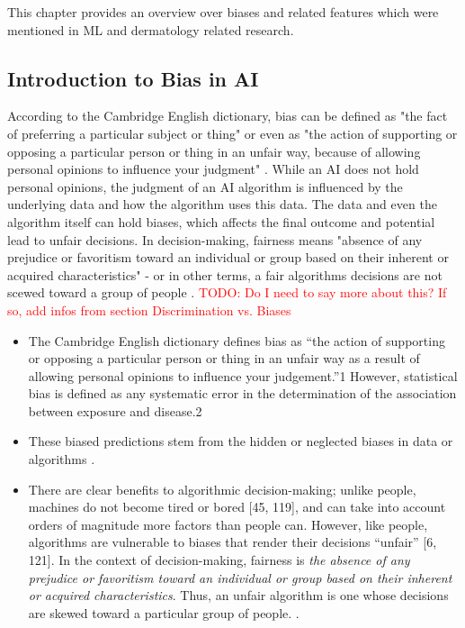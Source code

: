 \documentclass[12pt, a4paper, oneside]{book}   	%
\renewcommand{\todo}[1]{\textcolor{red}{TODO: #1}}
\newif\ifrawcitationactive
\newcommand{\rawcitationusedstart}{\color{violet}}
\newcommand{\rawcitationusedend}{%
	\ifrawcitationactive
	\color{purple}  %
	\else
	\color{black}  %
	\fi
}
\begin{document}
		This chapter provides an overview over biases and related features which were mentioned in ML and dermatology related research.
		
			\subsection{Introduction to Bias in AI}
			According to the Cambridge English dictionary, bias can be defined as "the fact of preferring a particular subject or thing" or even as "the action of supporting or opposing a particular person or thing in an unfair way, because of allowing personal opinions to influence your judgment" \autocite{Cambridge_2025}. While an AI does not hold personal opinions, the judgment of an AI algorithm is influenced by the underlying data and how the algorithm uses this data. The data and even the algorithm itself can hold biases, which affects the final outcome and potential lead to unfair decisions. In decision-making, fairness means "absence of any prejudice or favoritism toward an individual or group based on their inherent or acquired characteristics" - or in other terms, a fair algorithms decisions are not scewed toward a group of people \autocite{Mehrabi_2021}. 
			\todo{Do I need to say more about this? If so, add infos from section Discrimination vs. Biases}

			\rawcitationusedstart
			\begin{itemize}
				\item The Cambridge English dictionary defines bias as “the action of supporting or opposing a particular person or thing in an unfair way as a result of allowing personal opinions to influence your judgement.”1 However, statistical bias is defined as any systematic error in the determination of the association between exposure and disease.2 \autocite{Chakraborty_2024}
				\item These biased predictions stem from the hidden or neglected biases in data or algorithms \autocite{Mehrabi_2021}.
				\item There are clear benefits to algorithmic decision-making; unlike people, machines do not become tired or bored [45, 119], and can take into account orders of magnitude more factors than people can. However, like people, algorithms are vulnerable to biases that render their decisions “unfair” [6, 121]. In the context of decision-making, fairness is \textit{the absence of any prejudice or favoritism toward an individual or group based on their inherent or acquired characteristics}. Thus, an unfair algorithm is one whose decisions are skewed toward a particular group of people. \autocite{Mehrabi_2021}.
			\end{itemize}
			\rawcitationusedend
			
\end{document}
